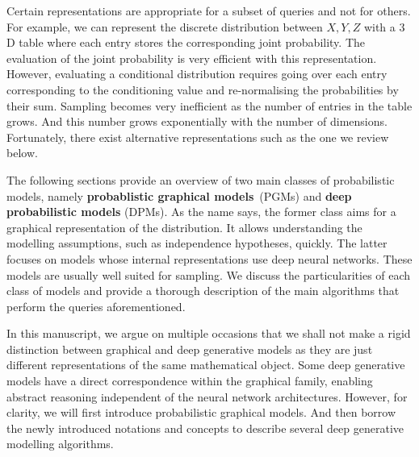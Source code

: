 Certain representations are appropriate for a subset of queries and not for others. For example, we can represent the discrete distribution between $X, Y, Z$ with a $3$D table where each entry stores the corresponding joint probability. The evaluation of the joint probability is very efficient with this representation. However, evaluating a conditional distribution requires going over each entry corresponding to the conditioning value and re-normalising the probabilities by their sum. Sampling becomes very inefficient as the number of entries in the table grows. And this number grows exponentially with the number of dimensions. Fortunately, there exist alternative representations such as the one we review below.

The following sections provide an overview of two main classes of probabilistic models, namely \textbf{probablistic graphical models}~(PGMs) and \textbf{deep probabilistic models} (DPMs). As the name says, the former class aims for a graphical representation of the distribution. It allows understanding the modelling assumptions, such as independence hypotheses, quickly. The latter focuses on models whose internal representations use deep neural networks. These models are usually well suited for sampling. We discuss the particularities of each class of models and provide a thorough description of the main algorithms that perform the queries aforementioned.

In this manuscript, we argue on multiple occasions that we shall not make a rigid distinction between graphical and deep generative models as they are just different representations of the same mathematical object. Some deep generative models have a direct correspondence within the graphical family, enabling abstract reasoning independent of the neural network architectures. However, for clarity, we will first introduce probabilistic graphical models. And then borrow the newly introduced notations and concepts to describe several deep generative modelling algorithms.


